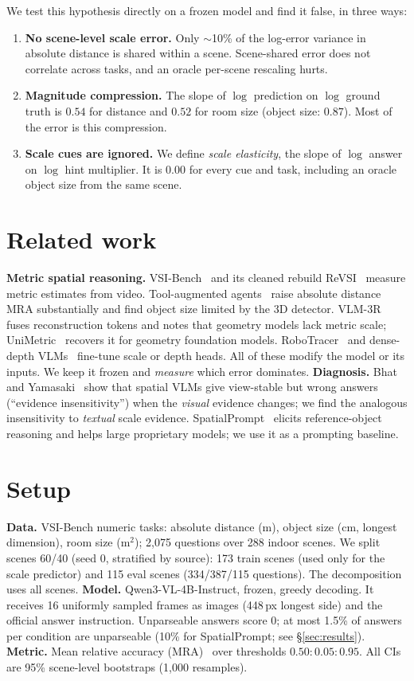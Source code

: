 \documentclass[10pt,twocolumn,letterpaper]{article}
\begin{document}
We test this hypothesis directly on a frozen model and find it false, in three ways:
\begin{enumerate}\itemsep0pt
\item \textbf{No scene-level scale error.} Only $\sim$10\% of the log-error variance in absolute distance is shared
within a scene. Scene-shared error does not correlate across tasks, and an oracle per-scene rescaling hurts.
\item \textbf{Magnitude compression.} The slope of $\log$ prediction on $\log$ ground truth is $0.54$ for
distance and $0.52$ for room size (object size: $0.87$). Most of the error is this compression.
\item \textbf{Scale cues are ignored.} We define \emph{scale elasticity}, the slope of $\log$ answer on
$\log$ hint multiplier. It is $0.00$ for every cue and task, including an oracle object size from the same scene.
\end{enumerate}

\section{Related work}
\textbf{Metric spatial reasoning.} VSI-Bench~\cite{yang2025thinking} and its cleaned rebuild ReVSI~\cite{revsi}
measure metric estimates from video. Tool-augmented agents~\cite{seeingnotmeasuring} raise absolute
distance MRA substantially and find object size limited by the 3D detector.
VLM-3R~\cite{fan2025vlm3r} fuses reconstruction tokens and notes that geometry models lack metric scale;
UniMetric~\cite{unimetric} recovers it for geometry foundation models. RoboTracer~\cite{robotracer} and
dense-depth VLMs~\cite{densedepthvlm} fine-tune scale or depth heads. All of these modify the model or its inputs.
We keep it frozen and \emph{measure} which error dominates.
\textbf{Diagnosis.} Bhat and Yamasaki~\cite{consistentyetwrong} show that spatial VLMs give view-stable but wrong answers
(``evidence insensitivity'') when the \emph{visual} evidence changes; we find the analogous insensitivity to
\emph{textual} scale evidence. SpatialPrompt~\cite{liao2024reasoning} elicits reference-object reasoning
and helps large proprietary models; we use it as a prompting baseline.

\section{Setup}
\textbf{Data.} VSI-Bench numeric tasks: absolute distance (m), object size (cm, longest dimension), room size (m$^2$);
2{,}075 questions over 288 indoor scenes. We split scenes 60/40 (seed 0, stratified by source):
173 train scenes (used only for the scale predictor) and 115 eval scenes (334/387/115 questions).
The decomposition uses all scenes.
\textbf{Model.} Qwen3-VL-4B-Instruct, frozen, greedy decoding. It receives 16 uniformly sampled frames as images
(448\,px longest side) and the official answer instruction. Unparseable answers score 0; at most 1.5\%
of answers per condition are unparseable (10\% for SpatialPrompt; see \S\ref{sec:results}).
\textbf{Metric.} Mean relative accuracy (MRA)~\cite{yang2025thinking} over thresholds $0.50{:}0.05{:}0.95$.
All CIs are 95\% scene-level bootstraps (1{,}000 resamples).
\end{document}
